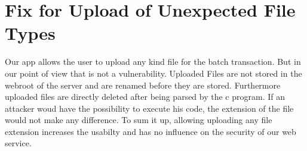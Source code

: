 \chapter{Fix for Upload of Unexpected File Types}
Our app allows the user to upload any kind file for the batch transaction. But in our point of view that is not a vulnerability. Uploaded Files are not stored in the webroot of the server and are renamed before they are stored. Furthermore uploaded files are directly deleted after being parsed by the c program.
If an attacker woud have the possibility to execute his code, the extension of the file would not make any difference.
To sum it up, allowing uploading any file extension increases the usabilty and has no influence on the security of our web service.